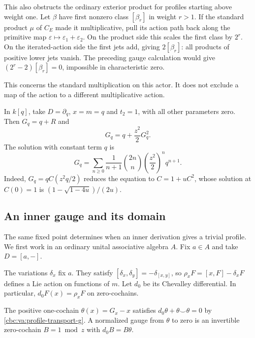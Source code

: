 This also obstructs the ordinary exterior product
for profiles starting above weight one.
Let $\beta$ have first nonzero class
$[\beta_r]$ in weight $r>1$.
If the standard product $\mu$ of $C_E$ made it
multiplicative, pull its action path back along
the primitive map $\varepsilon\mapsto
\varepsilon_1+\varepsilon_2$.
On the product side this scales the first
class by $2^r$. On the iterated-action side
the first jets add, giving $2[\beta_r]$:
all products of positive lower jets vanish.
The preceding gauge calculation would give
$(2^r-2)[\beta_r]=0$, impossible in
characteristic zero.

This concerns the standard multiplication
on this actor. It does not exclude a map of
the action to a different multiplicative action.

\begin{example}\label{cbc:va:quadratic-profile}
In $k[q]$, take $D=\partial_q$, $x=m=q$ and
$t_2=1$, with all other parameters zero.
Then $G_q=q+R$ and
\[
 G_q=q+\frac{z^2}{2}G_q^2.
\]
The solution with constant term $q$ is
\[
 G_q=\sum_{n\geq0}\frac1{n+1}\binom{2n}{n}
                    \left(\frac{z^2}{2}\right)^nq^{n+1}.
\]
Indeed, $G_q=qC(z^2q/2)$ reduces the equation to
$C=1+uC^2$, whose solution at $C(0)=1$ is
$(1-\sqrt{1-4u})/(2u)$.
\end{example}

\subsection{An inner gauge and its domain}
\label{cbc:va:inner}

The same fixed point determines when an inner
derivation gives a trivial profile. We first work
in an ordinary unital associative algebra $A$.
Fix $a\in A$ and take $D=[a,-]$.

The variations $\delta_x$ fix $a$.
They satisfy $[\delta_x,\delta_y]=-\delta_{[x,y]}$,
so $\rho_xF=[x,F]-\delta_xF$ defines a Lie action
on functions of $m$. Let $d_0$ be its Chevalley
differential. In particular, $d_0F(x)=\rho_xF$ on
zero-cochains.

The positive one-cochain $\theta(x)=G_x-x$ satisfies
$d_0\theta+\theta\smile\theta=0$ by
\eqref{cbc:va:profile-transport-g}.
A normalized gauge from $\theta$ to zero is an
invertible zero-cochain $B=1\bmod z$ with
$d_0B=B\theta$.

